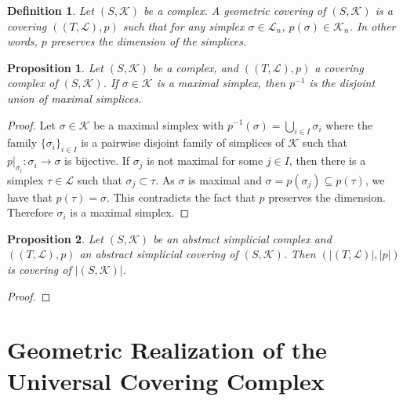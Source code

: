 \documentclass{amsart}
\newtheorem{proposition}{Proposition}[section]
\newtheorem{definition}{Definition}[section]
\begin{document}
\begin{definition}
Let $(S,\mathcal{K})$ be a complex. A geometric covering of $(S,\mathcal{K})$ is a covering $((T,\mathcal{L}),p)$ such that for any simplex $\sigma\in\mathcal{L}_n$, $p(\sigma)\in\mathcal{K}_n$. In other words, $p$ preserves the dimension of the simplices.
\end{definition}


\begin{proposition}
Let $(S,\mathcal{K})$ be a complex, and $((T,\mathcal{L}),p)$ a covering complex of $(S,\mathcal{K})$. If $\sigma\in\mathcal{K}$ is a maximal simplex, then $p^{-1}$ is the disjoint union of maximal simplices.
\end{proposition}

\begin{proof}
Let $\sigma\in\mathcal{K}$ be a maximal simplex with  $p^{-1}(\sigma)=\bigcup_{i\in I}\sigma_i$ where the family $\{\sigma_i\}_{i\in I}$ is a pairwise disjoint family of simplices of $\mathcal{K}$ such that $p|_{\sigma_i}\colon \sigma_i\longrightarrow \sigma$ is bijective. If $\sigma_j$ is not maximal for some $j\in I$, then there is a simplex $\tau\in\mathcal{L}$ such that $\sigma_j\subset \tau$. As $\sigma$ is maximal and $\sigma=p(\sigma_j)\subseteq p(\tau)$, we have that $p(\tau)=\sigma$. This contradicts the fact that $p$ preserves the dimension. Therefore $\sigma_i$ is a maximal simplex.
\end{proof}




\begin{proposition}
Let $(S,\mathcal{K})$ be an abstract simplicial complex and $((T,\mathcal{L}),p)$ an abstract simplicial covering of $(S,\mathcal{K})$. Then $(\vert (T,\mathcal{L})\vert,\vert p\vert)$ is covering of $\vert (S,\mathcal{K})\vert$.
\end{proposition}

\begin{proof}

\end{proof}

\section{Geometric Realization of the Universal Covering Complex}





\end{document}
